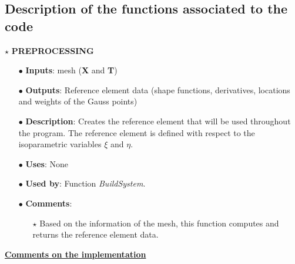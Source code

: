 \documentclass[a4paper,12pt,twoside,english]{article}
\newenvironment{myintro}[1]{%
	\tcolorbox[savedelimiter=mybox,
		savelowerto=\jobname_bspsave2.tex,
		lowerbox=ignored,
		colback=white,colframe=black,fonttitle=\bfseries,title=#1]}%
{\endtcolorbox}
\begin{document}
%  

\newpage

\subsection{Description of the functions associated to the code}

\vspace{0.3cm}

$\star$ \hspace{0.1cm} \textbf{PREPROCESSING} \\
	
	\begin{myintro}{\textbf{ReferenceElement}}
		\begin{enumerate}
			\item [$\bullet$] \textbf{Inputs}: mesh (\textbf{X} and \textbf{T})
			\item [$\bullet$] \textbf{Outputs}: Reference element data (shape functions, derivatives, locations and weights of the Gauss points) 
			\item [$\bullet$] \textbf{Description}: Creates the reference element that will be used throughout the program. The reference element is defined with respect to the isoparametric variables $\xi$ and $\eta$.
			\item [$\bullet$] \textbf{Uses}: None
			\item [$\bullet$] \textbf{Used by}: Function \textit{BuildSystem}.
			
			\item [$\bullet$] \textbf{Comments}: 
			\begin{enumerate}
				\item [$\star$] Based on the information of the mesh, this function computes and returns the reference element data.
			\end{enumerate}
		\end{enumerate}
	\end{myintro}
	

\vspace{0.5cm}	
\underline{\textbf{Comments on the implementation}}
	
\end{document}
